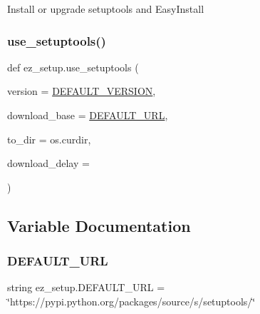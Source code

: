 \begin{DoxyVerb}Install or upgrade setuptools and EasyInstall\end{DoxyVerb}
 \mbox{\label{namespaceez__setup_a2d1c4fef79de3de83e9206d2329caebc}} 
\subsubsection{\texorpdfstring{use\+\_\+setuptools()}{use\_setuptools()}}
{\footnotesize\ttfamily def ez\+\_\+setup.\+use\+\_\+setuptools (\begin{DoxyParamCaption}\item[{}]{version = {\ttfamily \hyperlink{namespaceez__setup_aa031ee965f5310beedcd57236385d518}{D\+E\+F\+A\+U\+L\+T\+\_\+\+V\+E\+R\+S\+I\+ON}},  }\item[{}]{download\+\_\+base = {\ttfamily \hyperlink{namespaceez__setup_a8096341ad5ff1c048779efc8668fe864}{D\+E\+F\+A\+U\+L\+T\+\_\+\+U\+RL}},  }\item[{}]{to\+\_\+dir = {\ttfamily os.curdir},  }\item[{}]{download\+\_\+delay = {} }\end{DoxyParamCaption})}



\subsection{Variable Documentation}
\mbox{\label{namespaceez__setup_a8096341ad5ff1c048779efc8668fe864}} 
\subsubsection{\texorpdfstring{D\+E\+F\+A\+U\+L\+T\+\_\+\+U\+RL}{DEFAULT\_URL}}
{\footnotesize\ttfamily string ez\+\_\+setup.\+D\+E\+F\+A\+U\+L\+T\+\_\+\+U\+RL = \char`\"{}https\+://pypi.\+python.\+org/packages/source/s/setuptools/\char`\"{}}

\mbox{\label{namespaceez__setup_aa031ee965f5310beedcd57236385d518}} 
